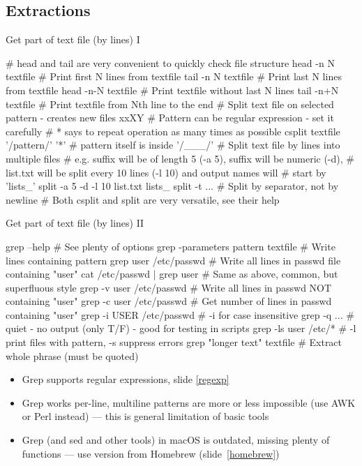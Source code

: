 \documentclass[compress, ucs, xelatex, 11pt, xcolor=svgnames, aspectratio=169,
	hyperref={
		bookmarks=true,
		unicode=true,
		colorlinks=true,
		pdftitle={Linux, command line and MetaCentrum},
		plainpages=false,
		pdfauthor={Vojtech Zeisek},
		pdfsubject={Course about use of Linux command line, writing shell scripts and using MetaCentrum of CESNET},
		pdfcreator={XeLaTeX},
		pdfkeywords={Linux, GNU, BASH, shell, command line, MetaCentrum},
		linkcolor=DarkRed, %
		anchorcolor=DarkBlue, %
		citecolor=Indigo, %
		filecolor=NavyBlue, %
		menucolor=DarkMagenta, %
		urlcolor=DarkBlue, %
		pdftex},
	url={hyphens, lowtilde} %
	]{beamer}
\begin{document}
\subsection{Extractions}

\begin{frame}[fragile]{Get part of text file (by lines) I}
	\begin{bashcode}
    # head and tail are very convenient to quickly check file structure
    head -n N textfile # Print first N lines from textfile
    tail -n N textfile # Print last N lines from textfile
    head -n-N textfile # Print textfile without last N lines
    tail -n+N textfile # Print textfile from Nth line to the end
    # Split text file on selected pattern - creates new files xxXY
    # Pattern can be regular expression - set it carefully
    # {*} says to repeat operation as many times as possible
    csplit textfile '/pattern/' '{*}' # pattern itself is inside '/___/'
    # Split text file by lines into multiple files
    # e.g. suffix will be of length 5 (-a 5), suffix will be numeric (-d),
    # list.txt will be split every 10 lines (-l 10) and output names will
    # start by 'lists_'
    split -a 5 -d -l 10 list.txt lists_
    split -t ... # Split by separator, not by newline
    # Both csplit and split are very versatile, see their help
	\end{bashcode}
\end{frame}

\begin{frame}[fragile]{Get part of text file (by lines) II}
	\begin{bashcode}
    grep --help # See plenty of options
    grep -parameters pattern textfile # Write lines containing pattern
    grep user /etc/passwd # Write all lines in passwd file containing "user"
    cat /etc/passwd | grep user # Same as above, common, but superfluous style
    grep -v user /etc/passwd # Write all lines in passwd NOT containing "user"
    grep -c user /etc/passwd # Get number of lines in passwd containing "user"
    grep -i USER /etc/passwd # -i for case insensitive
    grep -q ... # quiet - no output (only T/F) - good for testing in scripts
    grep -ls user /etc/* # -l print files with pattern, -s suppress errors
    grep "longer text" textfile # Extract whole phrase (must be quoted)
	\end{bashcode}
	\begin{itemize}
		\item Grep supports regular expressions, slide \ref{regexp}
		\item Grep works per-line, multiline patterns are more or less impossible (use AWK or Perl instead) --- this is general limitation of basic tools
		\item Grep (and sed and other tools) in macOS is outdated, missing plenty of functions --- use version from Homebrew (slide~\ref{homebrew})
	\end{itemize}
\end{frame}
\end{document}
